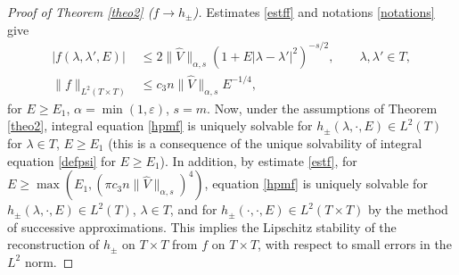 \documentclass[11pt,a4paper,english,subeqn]{amsart}
\theoremstyle{plain}
\theoremstyle{definition}
\numberwithin{equation}{section}
\begin{document}
\begin{proof}[Proof of Theorem \ref{theo2} ($f \longrightarrow h_{\pm}$)]
Estimates \eqref{estff} and notations \eqref{notations} give
\begin{subequations}
\begin{align}
|f(\lambda, \lambda',E)| &\leq 2 \| \widehat{V}\|_{\alpha,s} ( 1 + E |\lambda-\lambda'|^2)^{-s/2}, \qquad \lambda, \lambda' \in T,\\ \label{estf}
\|f\|_{L^2(T \times T)}&\leq c_3 n \| \widehat{V}\|_{\alpha,s} E^{-1/4},
\end{align}
\end{subequations}
for $E \geq E_1$, $\alpha = \min(1,\varepsilon)$, $s=m$. Now, under the assumptions of Theorem \ref{theo2}, integral equation \eqref{hpmf} is uniquely solvable for $h_{\pm}(\lambda, \cdot, E) \in L^2(T)$ for $\lambda \in T$, $E \geq E_1$ (this is a consequence of the unique solvability of integral equation \eqref{defpsi} for $E \geq E_1$). In addition, by estimate \eqref{estf}, for $E \geq \max(E_1, (\pi c_3 n \| \widehat{V}\|_{\alpha,s})^4)$, equation \eqref{hpmf} is uniquely solvable for $h_{\pm}(\lambda, \cdot, E) \in L^2(T)$, $\lambda \in T$, and for $h_{\pm}(\cdot , \cdot, E) \in L^2(T \times T)$ by the method of successive approximations. This implies the Lipschitz stability of the reconstruction of $h_{\pm}$ on $T \times T$ from $f$ on $T \times T$, with respect to small errors in the $L^2$ norm.
\end{proof}
\end{document}
